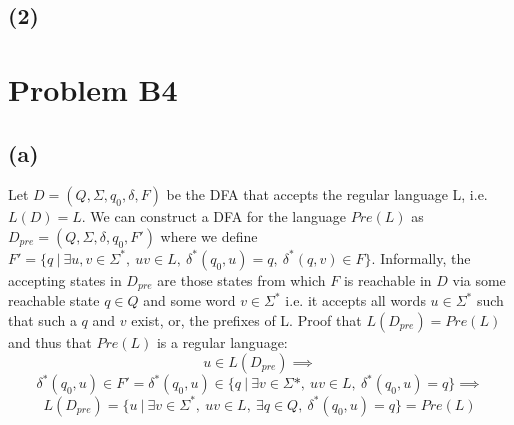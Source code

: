 \documentclass[12pt]{article}
\begin{document}
\subsection*{(2)}

\section*{Problem B4}
\subsection*{(a)}
  Let $D = (Q, \Sigma, q_0, \delta, F)$ be the DFA that accepts the regular
  language L, i.e. $L(D) = L$. We can construct a DFA for the language
  $Pre(L)$ as $D_{pre} = (Q, \Sigma, \delta, q_0, F')$ where we define
  $F' = \{q \:|\: \exists u,v \in \Sigma^* ,\: uv \in L
  ,\: \delta^* (q_0, u) = q ,\: \delta^* (q, v) \in F\}$.
  Informally, the accepting states in $D_{pre}$ are those states from which
  $F$ is reachable in $D$ via some reachable state $q \in Q$ and some
  word $v \in \Sigma^*$ i.e. it accepts all words $u \in \Sigma^*$
  such that such a $q$ and $v$ exist, or, the prefixes of L.
  Proof that $L(D_{pre}) = Pre(L)$ and thus that $Pre(L)$ is a regular language:
  $$u \in L(D_{pre}) \implies$$ $$\delta^*(q_0, u) \in F' =
  \delta^*(q_0, u) \in \{q \:|\: \exists v \in \Sigma* ,\: uv \in L
  ,\: \delta^*(q_0, u) = q\} \implies$$
  $$L(D_{pre}) = \{u \:|\: \exists v \in \Sigma^* ,\: uv \in L ,\:
  \exists q \in Q ,\: \delta^*(q_0, u) = q \}
  = Pre(L)$$
 
\end{document}
